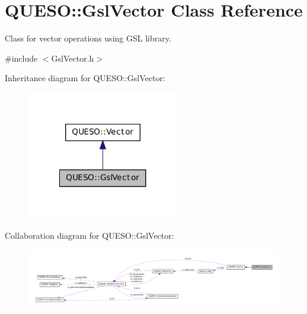 \hypertarget{class_q_u_e_s_o_1_1_gsl_vector}{\section{Q\-U\-E\-S\-O\-:\-:Gsl\-Vector Class Reference}
\label{class_q_u_e_s_o_1_1_gsl_vector}
}


Class for vector operations using G\-S\-L library.  




{\ttfamily \#include $<$Gsl\-Vector.\-h$>$}



Inheritance diagram for Q\-U\-E\-S\-O\-:\-:Gsl\-Vector\-:
\nopagebreak
\begin{figure}[H]
\begin{center}
\leavevmode
\includegraphics[width=188pt]{class_q_u_e_s_o_1_1_gsl_vector__inherit__graph}
\end{center}
\end{figure}


Collaboration diagram for Q\-U\-E\-S\-O\-:\-:Gsl\-Vector\-:
\nopagebreak
\begin{figure}[H]
\begin{center}
\leavevmode
\includegraphics[width=350pt]{class_q_u_e_s_o_1_1_gsl_vector__coll__graph}
\end{center}
\end{figure}
